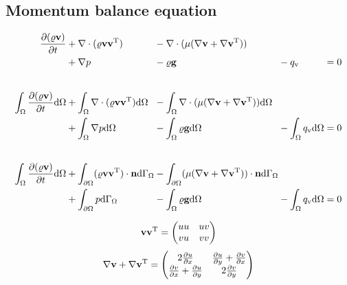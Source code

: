 \documentclass[a4paper,10pt]{scrartcl}
\begin{document}
\subsection{Momentum balance equation}
\begin{equation}
 \begin{alignedat}{6}
  \frac{\partial (\varrho \textbf{v})}{\partial t} &+ \nabla \cdot (\varrho \textbf{v} \textbf{v}^{\textup{T}}) &&- \nabla \cdot (\mu (\nabla \textbf{v} + \nabla \textbf{v}^{\textup{T}})) \\
    &+ \nabla p &&- \varrho \textbf{g} &&- q_{\textup{v}} &&= 0 \\[2em]
  \int_{\Omega} \frac{\partial (\varrho \textbf{v})}{\partial t} \text{d} \Omega &+ \int_{\Omega} \nabla \cdot (\varrho \textbf{v} \textbf{v}^{\textup{T}}) \text{d} \Omega 
    &&- \int_{\Omega} \nabla \cdot (\mu (\nabla \textbf{v} + \nabla \textbf{v}^{\textup{T}})) \text{d} \Omega \\
    &+ \int_{\Omega} \nabla p \text{d} \Omega &&- \int_{\Omega} \varrho \textbf{g} \text{d} \Omega &&- \int_{\Omega} q_{\textup{v}} \text{d} \Omega &&= 0 \\[2em]
  \int_{\Omega} \frac{\partial (\varrho \textbf{v})}{\partial t} \text{d} \Omega &+ \int_{\partial \Omega} (\varrho \textbf{v} \textbf{v}^{\textup{T}}) \cdot \textbf{n} \text{d} \Gamma_{\Omega}
    &&- \int_{\partial \Omega} (\mu (\nabla \textbf{v} + \nabla \textbf{v}^{\textup{T}})) \cdot \textbf{n} \text{d} \Gamma_{\Omega} \\
    &+ \int_{\partial \Omega} p \text{d} \Gamma_{\Omega} &&- \int_{\Omega} \varrho \textbf{g} \text{d} \Omega &&- \int_{\Omega} q_{\textup{v}} \text{d} \Omega &&= 0     
 \end{alignedat}
\end{equation}

\begin{equation}
 \textbf{v} \textbf{v}^{\textup{T}} = \begin{pmatrix}u u & u v \\ v u & v v \end{pmatrix}
\end{equation}
\begin{equation}
 \nabla \textbf{v} + \nabla \textbf{v}^{\textup{T}} =  \begin{pmatrix} 2 \frac{\partial u}{\partial x} & \frac{\partial u}{\partial y} + \frac{\partial v}{\partial x} \\
                                                        \frac{\partial v}{\partial x} + \frac{\partial u}{\partial y} & 2 \frac{\partial v}{\partial y}
                                                       \end{pmatrix}
\end{equation}
\end{document}
